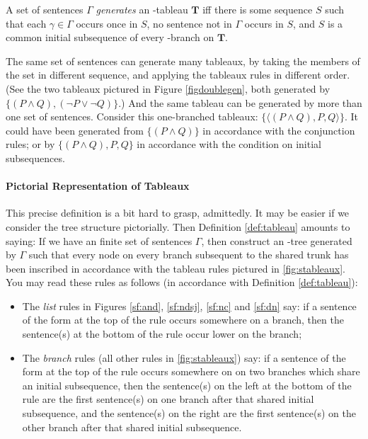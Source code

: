 \begin{definition} \label{def:gentabl}
	A set of sentences $\Gamma$ \emph{generates} an \lone-tableau $\mathbf{T}$ iff there is some sequence $S$ such that each $\gamma\in \Gamma$ occurs once in $S$, no sentence not in $\Gamma$ occurs in $S$, and $S$ is a common initial subsequence of every \lone-branch on $\mathbf{T}$. 
\end{definition}
The same set of sentences can generate many tableaux, by taking the members of the set in different sequence, and applying the tableaux rules in different order. (See the two tableaux pictured in Figure \ref{figdoublegen}, both generated by $\{(P\wedge Q),(¬P\vee ¬Q)\}$.) And the same tableau can be generated by more than one set of sentences. Consider this one-branched tableaux: $\{\langle (P\wedge Q), P, Q \rangle\}$. It could have been generated from $\{(P \wedge Q)\}$ in accordance with the conjunction rules; or by $\{(P\wedge Q), P, Q\}$ in accordance with the condition on initial subsequences. 

\paragraph{Pictorial Representation of Tableaux} This precise definition is a bit hard to grasp, admittedly. It may be easier if we consider the tree structure pictorially. Then Definition \ref{def:tableau} amounts to saying: If we have an finite set of sentences $\Gamma$, then construct an \lone-tree generated by $\Gamma$ such that every node on every branch subsequent to the shared trunk has been inscribed in accordance with the tableau rules pictured in \autoref{fig:stableaux}. You may read these rules as follows (in accordance with Definition \ref{def:tableau}): \begin{itemize}
	\item The \emph{list} rules in Figures \ref{sf:and}, \ref{sf:ndsj}, \ref{sf:nc} and \ref{sf:dn} say: if a sentence of the form at the top of the rule occurs somewhere on a branch, then the sentence(s) at the bottom of the rule occur lower on the branch;
	\item The \emph{branch} rules (all other rules in \autoref{fig:stableaux}) say: if a sentence of the form at the top of the rule occurs somewhere on on two branches which share an initial subsequence, then the sentence(s) on the left at the bottom of the rule are the first sentence(s) on one branch after that shared initial subsequence, and the sentence(s) on the right are the first sentence(s) on the other branch after that shared initial subsequence.
\end{itemize}

